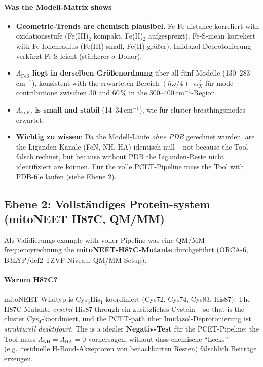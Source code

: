 \documentclass[11pt,a4paper,twoside]{article}
\theoremstyle{remark}
\begin{document}
\paragraph{Was the Modell-Matrix shows}
\begin{itemize}\setlength{\itemsep}{0pt}
  \item \textbf{Geometrie-Trends are chemisch plausibel.}
        Fe-Fe-distance korreliert with oxidationsstufe (Fe(III)$_2$
        kompakt, Fe(II)$_2$ aufgespreizt). Fe-S-mean
        korreliert with Fe-Ionenradius (Fe(III) small, Fe(II)
        gr\"o{\ss}er). Imidazol-Deprotonierung verk\"urzt Fe-S leicht
        (st\"arkerer $\sigma$-Donor).
  \item \textbf{$\Lambda_\text{FeS}$ liegt in derselben Gr\"o{\ss}enordnung}
        \"uber all f\"unf Modelle (130--283\,cm$^{-1}$), konsistent
        with the erwarteten Bereich
        $(\hbar\omega/4)\cdot\alpha_X^2$ f\"ur mode contributione zwischen
        30 and 60\,\% in the 300--400\,cm$^{-1}$-Region.
  \item \textbf{$\Lambda_\text{FeFe}$ is small and stabil}
        (14--34\,cm$^{-1}$), wie f\"ur cluster breathingsmodes
        erwartet.
  \item \textbf{Wichtig zu wissen}: Da the Modell-L\"aufe \emph{ohne PDB}
        gerechnet wurden, are the Liganden-Kan\"ale (FeN, NH, HA)
        identisch null -- not because the Tool falsch rechnet,
        but because without PDB the Liganden-Reste nicht
        identifiziert are k\"onnen. F\"ur the volle PCET-Pipeline
        muss the Tool with PDB-file laufen (siehe Ebene 2).
\end{itemize}

\subsection{Ebene 2: Vollst\"andiges Protein-system
            (mitoNEET H87C, QM/MM)}
\label{sec:val-mitoneet-h87c}

Als Validierungs-example with voller Pipeline was eine
QM/MM-frequencyrechnung the \textbf{mitoNEET-H87C-Mutante}
durchgef\"uhrt (ORCA-6, B3LYP/def2-TZVP-Niveau, QM/MM-Setup).

\paragraph{Warum H87C?}
mitoNEET-Wildtyp is Cys$_3$His$_1$-koordiniert (Cys72, Cys74,
Cys83, His87). The H87C-Mutante \emph{ersetzt} His87 through ein
zus\"atzliches Cystein -- so that is the cluster Cys$_4$-koordiniert,
und the PCET-path \"uber Imidazol-Deprotonierung ist
\emph{strukturell deaktifourt}. The is a idealer
\textbf{Negativ-Test} f\"ur the PCET-Pipeline: the Tool muss
$\Lambda_\text{NH} = \Lambda_\text{HA} = 0$ vorhersagen, without dass
chemische "`Lecks"' (e.g.\ residuelle H-Bond-Akzeptoren von
benachbarten Resten) f\"alschlich Beitr\"age erzeugen.
\end{document}
